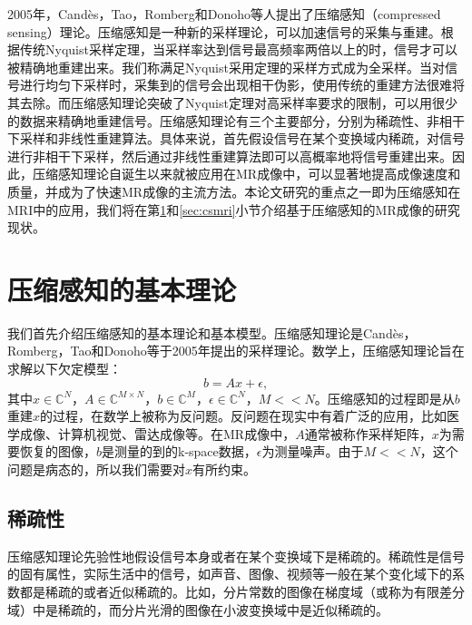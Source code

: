 2005年，Candès，Tao，Romberg\cite{candes2004near,candes2006compressive,candes2006quantitative,candes2006stable}和Donoho\cite{Donoho2006Compressed}等人提出了压缩感知（compressed sensing）理论。压缩感知是一种新的采样理论，可以加速信号的采集与重建。根据传统Nyquist采样定理\cite{Nyquist}，当采样率达到信号最高频率两倍以上的时，信号才可以被精确地重建出来。我们称满足Nyquist采用定理的采样方式成为全采样。当对信号进行均匀下采样时，采集到的信号会出现相干伪影，使用传统的重建方法很难将其去除。而压缩感知理论突破了Nyquist定理对高采样率要求的限制，可以用很少的数据来精确地重建信号。压缩感知理论有三个主要部分，分别为稀疏性、非相干下采样和非线性重建算法。具体来说，首先假设信号在某个变换域内稀疏，对信号进行非相干下采样，然后通过非线性重建算法即可以高概率地将信号重建出来。因此，压缩感知理论自诞生以来就被应用在MR成像中，可以显著地提高成像速度和质量，并成为了快速MR成像的主流方法。本论文研究的重点之一即为压缩感知在MRI中的应用，我们将在第\ref{sec:cs}和\ref{sec:csmri}小节介绍基于压缩感知的MR成像的研究现状。

\section{压缩感知的基本理论}
\label{sec:cs}
我们首先介绍压缩感知的基本理论和基本模型。压缩感知理论是Candès，Romberg，Tao\cite{candes2004near,candes2006compressive,candes2006quantitative,candes2006stable}和Donoho\cite{Donoho2006Compressed}等于2005年提出的采样理论。数学上，压缩感知理论旨在求解以下欠定模型：
\begin{equation}
	b=Ax+\epsilon,
	\label{equ:cs}
\end{equation}
其中$x\in \mathbb{C}^N$，$A\in \mathbb{C}^{M\times N}$，$b\in \mathbb{C}^M$，$\epsilon\in \mathbb{C}^N$，$M<<N$。压缩感知的过程即是从$b$重建$x$的过程，在数学上被称为反问题。反问题在现实中有着广泛的应用，比如医学成像\cite{golbabaee2012hyperspectral,quinsac2010compressed,xu2012low,lustig2006}、计算机视觉\cite{wright2008robust}、雷达成像\cite{choi2010compressed}等。在MR成像中，$A$通常被称作采样矩阵，$x$为需要恢复的图像，$b$是测量的到的k-space数据，$\epsilon$为测量噪声。由于$M<<N$，这个问题是病态的，所以我们需要对$x$有所约束。

\subsection{稀疏性}
压缩感知理论先验性地假设信号本身或者在某个变换域下是稀疏的。稀疏性是信号的固有属性，实际生活中的信号，如声音、图像、视频等一般在某个变化域下的系数都是稀疏的或者近似稀疏的。比如，分片常数的图像在梯度域（或称为有限差分域）中是稀疏的，而分片光滑的图像在小波变换域中是近似稀疏的。

